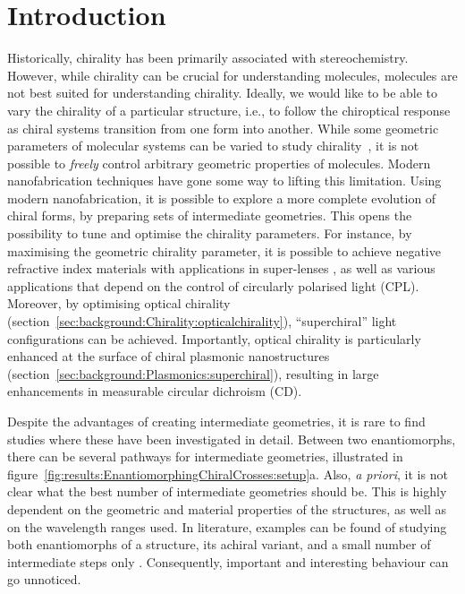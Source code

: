 \section{Introduction}\label{sec:results:EnantiomorphingChiralCrosses:introduction}
Historically, chirality has been primarily associated with stereochemistry. However, while chirality can be crucial for understanding molecules, molecules are not best suited for understanding chirality. 
Ideally, we would like to be able to vary the chirality of a particular structure, i.e., to follow the chiroptical response as chiral systems transition from one form into another. While some geometric parameters of molecular systems can be varied to study chirality~\cite{Katzenelson2000}, it is not possible to \emph{freely} control arbitrary geometric properties of molecules. Modern nanofabrication techniques have gone some way to lifting this limitation.
Using modern nanofabrication, it is possible to explore a more complete evolution of chiral forms, by preparing sets of intermediate geometries. This opens the possibility to tune and optimise the chirality parameters. For instance, by maximising the geometric chirality parameter, it is possible to achieve negative refractive index materials with applications in super-lenses \cite{Khorasaninejad2016}, as well as various applications that depend on the control of circularly polarised light (CPL). 
Moreover, by optimising optical chirality (section~\ref{sec:background:Chirality:opticalchirality}), ``superchiral'' light configurations can be achieved. Importantly, optical chirality is particularly enhanced at the surface of chiral plasmonic nanostructures (section~\ref{sec:background:Plasmonics:superchiral}), resulting in large enhancements in measurable circular dichroism (CD).

Despite the advantages of creating intermediate geometries, it is rare to find studies where these have been investigated in detail. Between two enantiomorphs, there can be several pathways for intermediate geometries, illustrated in figure~\ref{fig:results:EnantiomorphingChiralCrosses:setup}a. 
Also, \textit{a priori}, it is not clear what the best number of intermediate geometries should be. This is highly dependent on the geometric and material properties of the structures, as well as on the wavelength ranges used. In literature, examples can be found of studying both enantiomorphs of a structure, its achiral variant, and a small number of intermediate steps only \cite{Zu2016}. Consequently, important and interesting behaviour can go unnoticed.

